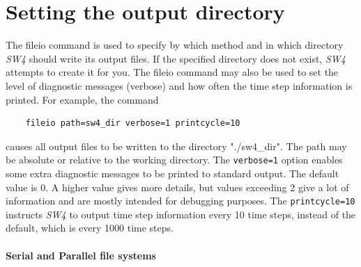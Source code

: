 \documentclass[11pt]{report}
\begin{document}
{\section{Setting the output directory}\label{sec:output-dir}
The fileio command is used to specify by which method and in which directory \emph{SW4} should write
its output files.  If the specified directory does not exist, \emph{SW4} attempts to create it for you. The
fileio command may also be used to set the level of diagnostic messages (verbose) and how often the
time step information is printed. For example, the command
\begin{verbatim}
	fileio path=sw4_dir verbose=1 printcycle=10
\end{verbatim}
causes all output files to be written to the directory "./sw4\_dir". The path may be absolute or
relative to the working directory. The \verb+verbose=1+ option enables some extra diagnostic
messages to be printed to standard output. The default value is 0. A higher value gives more
details, but values exceeding 2 give a lot of information and are mostly intended for debugging
purposes. The \verb+printcycle=10+ instructs \emph{SW4} to output time step information every 10
time steps, instead of the default, which is every 1000 time steps.

\paragraph{Serial and Parallel file systems}

}
\end{document}
